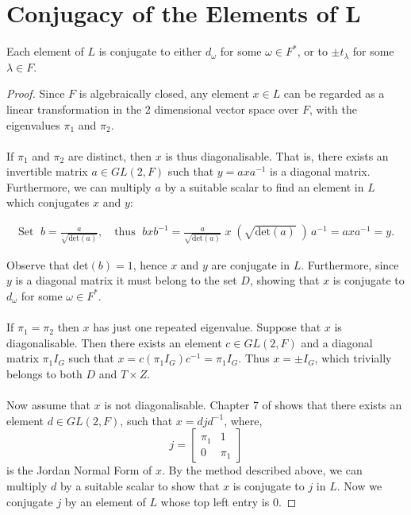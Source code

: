 \section[Conjugacy of the Elements of $L$]{Conjugacy of the Elements of $\pmb{L}$}

\begin{proposition}\label{6.3} Each element of $L$ is conjugate to either $d_\omega$ for some $\omega \in F^*$, or to $\pm t_\lambda$ for some $\lambda \in F$.
\end{proposition}

\begin{proof} Since $F$ is algebraically closed, any element $x \in L$ can be regarded as a linear transformation in the 2 dimensional vector space over $F$, with the eigenvalues $\pi_1$ and $\pi_2$. \\
\\
\space If $\pi_1$ and $\pi_2$ are distinct, then $x$ is thus diagonalisable. That is, there exists an invertible matrix $a \in GL(2, F)$ such that $y = axa^{-1}$ is a diagonal matrix. Furthermore, we can multiply $a$ by a suitable scalar to find an element in $L$ which conjugates $x$ and $y$:

\begin{align*} \text{Set } \; b = \frac{a}{\sqrt {\text{det}(a)}}, \quad \text{thus } \; bxb^{-1} =\frac{a}{\sqrt {\text{det}(a)}} \; x \; (\sqrt{\text{det}(a)} \; )\,a^{-1} = axa^{-1} = y.
\end{align*}

Observe that det$(b)=1$, hence $x$ and $y$ are conjugate in $L$. Furthermore, since $y$ is a diagonal matrix it must belong to the set $D$, showing that $x$ is conjugate to $d_\omega$ for some $\omega \in F^*$. \\
\\
\space If $\pi_1 = \pi_2$ then $x$ has just one repeated eigenvalue. Suppose that $x$ is diagonalisable. Then there exists an element $c \in GL(2, F)$ and a diagonal matrix $\pi_1 I_G$ such that $x = c(\pi_1 I_G)c^{-1} = \pi_1 I_G$. Thus $x = \pm I_G$, which trivially belongs to both $D$ and $T \times Z$. \\
\\
Now assume that $x$ is not diagonalisable. Chapter 7 of \cite{matrix} shows that there exists an element $d \in GL(2, F)$, such that $x= djd^{-1}$, where, $$j = \begin{bmatrix} \pi_1 & 1 \\ 0 & \pi_1 \end{bmatrix}$$ is the Jordan Normal Form of $x$. By the method described above, we can multiply $d$ by a suitable scalar to show that $x$ is conjugate to $j$ in $L$. Now we conjugate $j$ by an element of $L$ whose top left entry is 0.


\end{proof}
